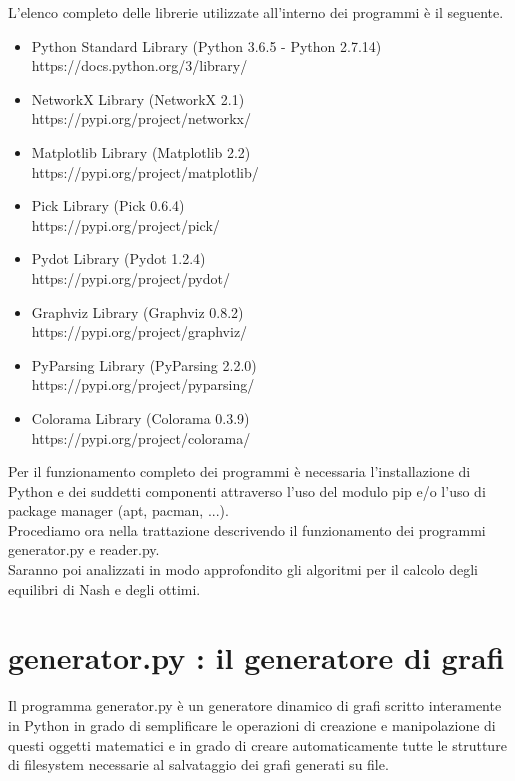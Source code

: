 L'elenco completo delle librerie utilizzate all'interno dei programmi è il seguente.

\begin{itemize}
	\item Python Standard Library (Python 3.6.5 - Python 2.7.14)\\
	https://docs.python.org/3/library/
	\item NetworkX Library (NetworkX 2.1)\\ 	
	https://pypi.org/project/networkx/	
	\item Matplotlib Library (Matplotlib 2.2)\\
	https://pypi.org/project/matplotlib/
	\item Pick Library (Pick 0.6.4)\\
	https://pypi.org/project/pick/
	\item Pydot Library (Pydot 1.2.4)\\
	https://pypi.org/project/pydot/
	\item Graphviz Library (Graphviz 0.8.2)\\
	https://pypi.org/project/graphviz/
	\item PyParsing Library (PyParsing 2.2.0)\\
	https://pypi.org/project/pyparsing/
	\item Colorama Library (Colorama 0.3.9)\\
	https://pypi.org/project/colorama/
\end{itemize}

Per il funzionamento completo dei programmi è necessaria l'installazione di Python e dei suddetti componenti attraverso l'uso del modulo pip e/o l'uso di package manager (apt, pacman, ...).\\

Procediamo ora nella trattazione descrivendo il funzionamento dei programmi generator.py e reader.py.\\
Saranno poi analizzati in modo approfondito gli algoritmi per il calcolo degli equilibri di Nash e degli ottimi.\\

\section{generator.py : il generatore di grafi}
\justify
Il programma generator.py è un generatore dinamico di grafi scritto interamente in Python in grado di semplificare le operazioni di creazione e manipolazione di questi oggetti matematici e in grado di creare automaticamente tutte le strutture di filesystem necessarie al salvataggio dei grafi generati su file.\\

